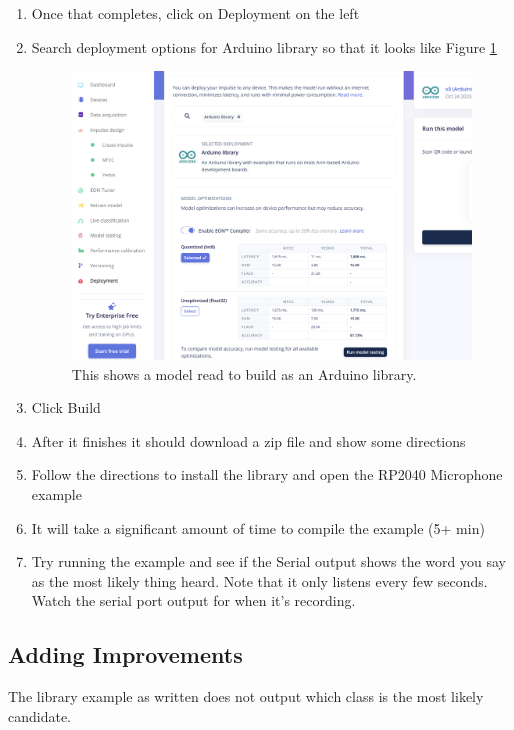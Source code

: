 \begin{enumerate}
  \item Once that completes, click on Deployment on the left 
  \item Search deployment options for Arduino library so that it looks like Figure \ref{fig:edgeimpulsearduino}

  \begin{figure}[!htb]
    \centering
    \includegraphics[scale=0.3]{machineLearning/arduino.png}
    \caption{This shows a model read to build as an Arduino library.}
    \label{fig:edgeimpulsearduino}
  \end{figure} 

  \item Click Build
  \item After it finishes it should download a zip file and show some directions
  \item Follow the directions to install the library and open the RP2040 Microphone example 
  \item It will take a significant amount of time to compile the example (5+ min)
  \item Try running the example and see if the Serial output shows the word you say as the 
          most likely thing heard. Note that it only listens every few seconds. Watch the 
          serial port output for when it's recording.
\end{enumerate}

\subsection{Adding Improvements}
The library example as written does not output which class is the most likely candidate.


